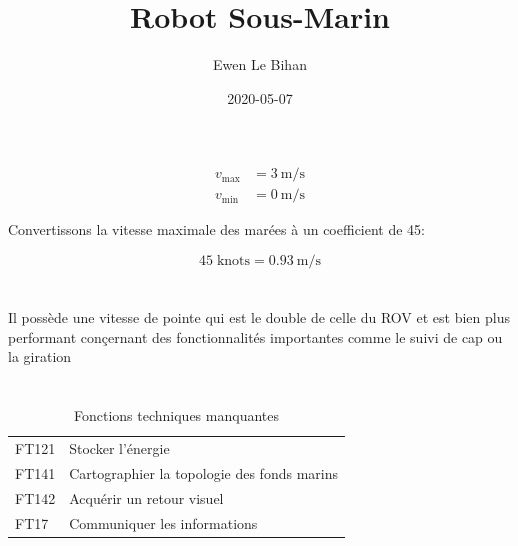 \documentclass{article}
\title{Robot Sous-Marin}
\author{Ewen Le Bihan}
\date{2020-05-07}
\begin{document}
\maketitle

\section{}
\begin{equation*}
    \begin{split}
        v_{\max} &= \SI{3}{\meter\per\second} \\
        v_{\min} &= \SI{0}{\meter\per\second}
    \end{split}
\end{equation*}

Convertissons la vitesse maximale des marées à un coefficient de 45:

$$45\;\text{knots} = \SI{0.93}{\meter\per\second}$$



\section{}

Il possède une vitesse de pointe qui est le double de celle du ROV et est bien plus performant conçernant des fonctionnalités importantes comme le suivi de cap ou la giration

\section{}

\begin{table}[h]
    \centering
    \begin{tabular}{ll}
        FT121 & Stocker l'énergie\\
        FT141 & Cartographier la topologie des fonds marins \\
        FT142 & Acquérir un retour visuel\\
        FT17  & Communiquer les informations \\
    \end{tabular}
    \caption{Fonctions techniques manquantes}
    \label{tab:fonctions_techniques_manquantes}
\end{table}

\section{}
\end{document}
